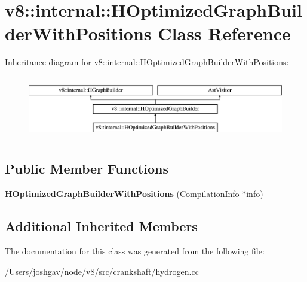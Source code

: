 \hypertarget{classv8_1_1internal_1_1_h_optimized_graph_builder_with_positions}{}\section{v8\+:\+:internal\+:\+:H\+Optimized\+Graph\+Builder\+With\+Positions Class Reference}
\label{classv8_1_1internal_1_1_h_optimized_graph_builder_with_positions}
Inheritance diagram for v8\+:\+:internal\+:\+:H\+Optimized\+Graph\+Builder\+With\+Positions\+:\begin{figure}[H]
\begin{center}
\leavevmode
\includegraphics[height=2.790698cm]{classv8_1_1internal_1_1_h_optimized_graph_builder_with_positions}
\end{center}
\end{figure}
\subsection*{Public Member Functions}
\begin{DoxyCompactItemize}
\item 
{\bfseries H\+Optimized\+Graph\+Builder\+With\+Positions} (\hyperlink{classv8_1_1internal_1_1_compilation_info}{Compilation\+Info} $\ast$info)\hypertarget{classv8_1_1internal_1_1_h_optimized_graph_builder_with_positions_a60b07460a4997cc11321853e2b4bae35}{}\label{classv8_1_1internal_1_1_h_optimized_graph_builder_with_positions_a60b07460a4997cc11321853e2b4bae35}

\end{DoxyCompactItemize}
\subsection*{Additional Inherited Members}


The documentation for this class was generated from the following file\+:\begin{DoxyCompactItemize}
\item 
/\+Users/joshgav/node/v8/src/crankshaft/hydrogen.\+cc\end{DoxyCompactItemize}
